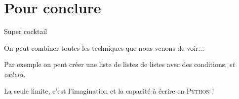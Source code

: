 \documentclass[10pt]{beamer}
\begin{document}
    \section{Pour conclure}

    \begin{frame}{Super cocktail}
        \pause

        On peut combiner toutes les techniques que nous venons de voir...\\\pause

        Par exemple on peut créer une liste de listes de listes avec des conditions, \textit{et c\ae tera}.\\\pause

        La seule limite, c'est l'imagination et la capacité à écrire en \textsc{Python} !
    \end{frame}
\end{document}
